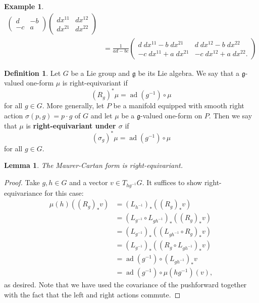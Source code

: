 \documentclass{book}
\newcommand{\fr}{\mathfrak}
\DeclareMathOperator{\ad}{ad}
\theoremstyle{plain}
\newtheorem{lem}[thm]{Lemma}
\theoremstyle{definition}
\newtheorem{defn}{Definition}
\newtheorem{exmp}{Example}
\theoremstyle{remark}
\begin{document}
\begin{exmp}
\begin{align*}
\begin{pmatrix}
            d&-b\\-c&a
        \end{pmatrix}\begin{pmatrix}
            dx^{11}&dx^{12}\\dx^{21}&dx^{22}
        \end{pmatrix}\\
        &=\frac{1}{ad-bc}\begin{pmatrix}
            d\;dx^{11}-b\;dx^{21}&d\;dx^{12}-b\;dx^{22}\\-c\;dx^{11}+a\;dx^{21}&-c\;dx^{12}+a\;dx^{22}.
        \end{pmatrix}
    \end{align*}
\end{exmp}

\begin{defn}
    Let $G$ be a Lie group and $\fr g$ be its Lie algebra. We say that a $\fr g$-valued one-form $\mu$ is right-equivariant if
    \[(R_g)^*\mu=\ad(g^{-1})\circ \mu\]
    for all $g\in G$. More generally, let $P$ be a manifold equipped with smooth right action $\sigma(p,g)=p\cdot g$ of $G$ and let $\mu$ be a $\fr g$-valued one-form
    on $P$. Then we say that $\mu$ is \textbf{right-equivariant under $\sigma$} if
    \[(\sigma_g)^*\mu=\ad(g^{-1})\circ \mu\]
    for all $g\in G$.
\end{defn}

\begin{lem}
    The Maurer-Cartan form is right-equivariant.
\end{lem}
\begin{proof}
    Take $g,h\in G$ and a vector $v\in T_{hg^{-1}}G$. It suffices to show right-equivariance for this case:
    \begin{align*}
        \mu(h)\left( (R_g)_*v \right)&=(L_{h^{-1}})_*\left( (R_g)_*v \right)\\
        &=(L_{g^{-1}}\circ L_{gh^{-1}})_*\left( (R_g)_*v \right)\\
        &=(L_{g^{-1}})_*\left( (L_{gh^{-1}}\circ R_g)_*v \right)\\
        &=(L_{g^{-1}})_*\left( (R_g\circ L_{gh^{-1}})_*v\right)\\
        &=\ad(g^{-1})\circ (L_{gh^{-1}})_*v\\
        &=\ad(g^{-1})\circ \mu(hg^{-1})(v),
    \end{align*}
    as desired. Note that we have used the covariance of the pushforward together with the fact that the left and right actions
    commute.
\end{proof}
\end{document}
